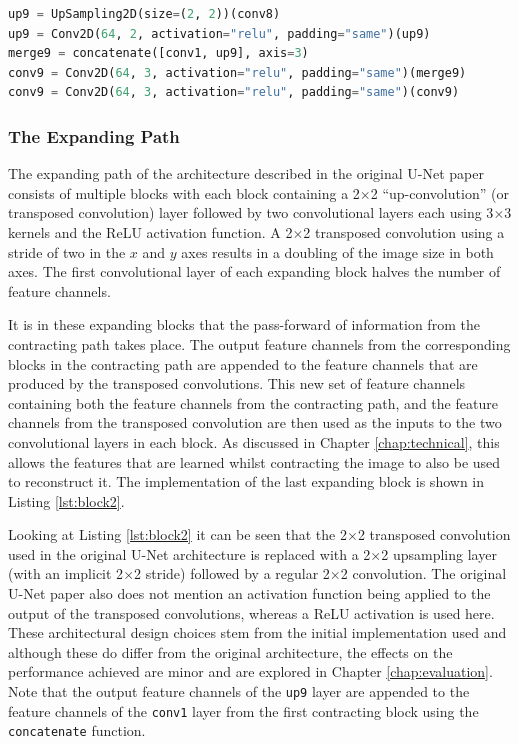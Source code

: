 \begin{lstlisting}[float={!t},caption={The implementation of the last expanding block of the U-Net architecture using the Keras functional API.},label={lst:block2},language=Python,upquote=true,belowskip=0pt]
up9 = UpSampling2D(size=(2, 2))(conv8)
up9 = Conv2D(64, 2, activation="relu", padding="same")(up9)
merge9 = concatenate([conv1, up9], axis=3)
conv9 = Conv2D(64, 3, activation="relu", padding="same")(merge9)
conv9 = Conv2D(64, 3, activation="relu", padding="same")(conv9)
\end{lstlisting}
\subsubsection{The Expanding Path}

The expanding path of the architecture described in the original U-Net paper consists of multiple blocks with each block containing a 2$\times$2 ``up-convolution'' (or transposed convolution) layer followed by two convolutional layers each using 3$\times$3 kernels and the ReLU activation function. A 2$\times$2 transposed convolution using a stride of two in the $x$ and $y$ axes results in a doubling of the image size in both axes. The first convolutional layer of each expanding block halves the number of feature channels.

It is in these expanding blocks that the pass-forward of information from the contracting path takes place. The output feature channels from the corresponding blocks in the contracting path are appended to the feature channels that are produced by the transposed convolutions. This new set of feature channels containing both the feature channels from the contracting path, and the feature channels from the transposed convolution are then used as the inputs to the two convolutional layers in each block. As discussed in Chapter \ref{chap:technical}, this allows the features that are learned whilst contracting the image to also be used to reconstruct it. The implementation of the last expanding block is shown in Listing \ref{lst:block2}.

Looking at Listing \ref{lst:block2} it can be seen that the 2$\times$2 transposed convolution used in the original U-Net architecture is replaced with a 2$\times$2 upsampling layer (with an implicit 2$\times$2 stride) followed by a regular 2$\times$2 convolution. The original U-Net paper also does not mention an activation function being applied to the output of the transposed convolutions, whereas a ReLU activation is used here. These architectural design choices stem from the initial implementation used and although these do differ from the original architecture, the effects on the performance achieved are minor and are explored in Chapter \ref{chap:evaluation}. Note that the output feature channels of the \texttt{up9} layer are appended to the feature channels of the \texttt{conv1} layer from the first contracting block using the \texttt{concatenate} function.

